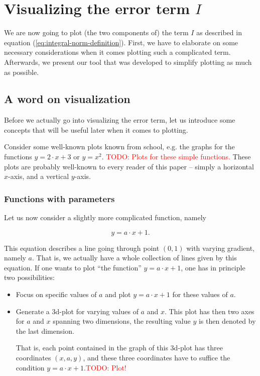 \documentclass{article}
\newcommand{\todo}[1]{\textcolor{red}{TODO: #1}}
\begin{document}
\section{Visualizing the error term $I$}
\label{sec:making-the-whole-thing-interactive}

We are now going to plot (the two components of) the term $I$ as described in equation (\ref{eq:integral-norm-definition}). First, we have to elaborate on some necessary considerations when it comes plotting such a complicated term. Afterwards, we present our tool that was developed to simplify plotting as much as possible.

\subsection{A word on visualization}
\label{sec:a-word-on-visualization}

Before we actually go into visualizing the error term, let us introduce some concepts that will be useful later when it comes to plotting.

Consider some well-known plots known from school, e.g. the graphs for the functions $y=2\cdot x+3$ or $y=x^2$. \todo{Plots for these simple functions.} These plots are probably well-known to every reader of this paper -- simply a horizontal $x$-axis, and a vertical $y$-axis. 

\subsubsection{Functions with parameters}

Let us now consider a slightly more complicated function, namely

\begin{equation*}
  y = a\cdot x+1.
\end{equation*}

This equation describes a line going through point $(0,1)$ with varying gradient, namely $a$. That is, we actually have a whole collection of lines given by this equation. If one wants to plot ``the function'' $y=a\cdot x + 1$, one has in principle two possibilities:

\begin{itemize}
\item Focus on specific values of $a$ and plot $y=a\cdot x + 1$ for these values of $a$.
\item Generate a 3d-plot for varying values of $a$ and $x$. This plot has then two axes for $a$ and $x$ spanning two dimensions, the resulting value $y$ is then denoted by the last dimension.

  That is, each point contained in the graph of this 3d-plot has three coordinates $(x,a,y)$, and these three coordinates have to suffice the condition $y=a\cdot x + 1$.\todo{Plot!}
\end{itemize}
\end{document}
